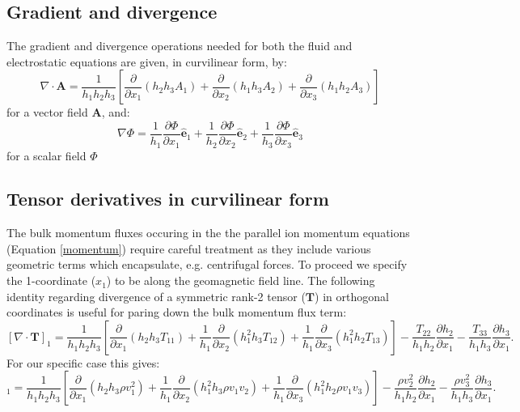 \documentclass[11pt,letterpaper]{article}
\begin{document}
\subsection{Gradient and divergence}

The gradient and divergence operations needed for both the fluid and electrostatic equations are given, in curvilinear form, by:
\begin{equation}
\nabla \cdot \mathbf{A} = \frac{1}{h_1 h_2 h_3} \left[ \frac{\partial}{\partial x_1} \left( h_2 h_3 A_1 \right) + \frac{\partial}{\partial x_2} \left( h_1 h_3 A_2 \right) + \frac{\partial}{\partial x_3} \left( h_1 h_2 A_3 \right) \right]
\end{equation}
for a vector field $\mathbf{A}$, and:
\begin{equation}
\nabla \Phi = \frac{1}{h_1} \frac{\partial \Phi}{\partial x_1} \hat{\mathbf{e}}_1 + \frac{1}{h_2} \frac{\partial \Phi}{\partial x_2} \hat{\mathbf{e}}_2 + \frac{1}{h_3} \frac{\partial \Phi}{\partial x_3} \hat{\mathbf{e}}_3
\end{equation}
for a scalar field $\Phi$



\subsection{Tensor derivatives in curvilinear form}

The bulk momentum fluxes occuring in the the parallel ion momentum equations (Equation \ref{momentum}) require careful treatment as they include various geometric terms which encapsulate, e.g. centrifugal forces.  To proceed we specify the 1-coordinate ($x_1$) to be along the geomagnetic field line.  The following identity regarding divergence of a symmetric rank-2 tensor ($\mathbf{T}$) in orthogonal coordinates is useful for paring down the bulk momentum flux term:
\begin{equation}
\left[ \nabla \cdot \mathbf{T} \right]_1 = \frac{1}{h_1 h_2 h_3} \left[ \frac{\partial}{\partial x_1}(h_2 h_3 T_{11}) + \frac{1}{h_1} \frac{\partial}{\partial x_2}(h_1^2 h_3 T_{12}) + \frac{1}{h_1} \frac{\partial}{\partial x_3}(h_1^2 h_2 T_{13}) \right] - \frac{T_{22}}{h_1 h_2} \frac{\partial h_2}{\partial x_1} - \frac{T_{33}}{h_1 h_3} \frac{\partial h_3}{\partial x_1}.  \label{divtens}
\end{equation}
For our specific case this gives:
\begin{equation}
[\nabla \cdot (\rho \mathbf{v} \mathbf{v})]_1 = \frac{1}{h_1 h_2 h_3} \left[ \frac{\partial}{\partial x_1}(h_2 h_3 \rho v_1^2) + \frac{1}{h_1} \frac{\partial}{\partial x_2}(h_1^2 h_3 \rho v_1 v_2) + \frac{1}{h_1} \frac{\partial}{\partial x_3}(h_1^2 h_2 \rho v_1 v_3) \right] - \frac{\rho v_2^2}{h_1 h_2} \frac{\partial h_2}{\partial x_1} - \frac{\rho v_3^2}{h_1 h_3} \frac{\partial h_3}{\partial x_1}.
\end{equation}
\end{document}
